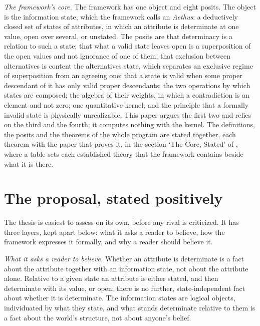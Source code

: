 \emph{The framework's core.} The framework has one object and eight posits. The object is the information state, which the framework calls an \emph{Aethus}: a deductively closed set of states of attributes, in which an attribute is determinate at one value, open over several, or unstated. The posits are that determinacy is a relation to such a state; that what a valid state leaves open is a superposition of the open values and not ignorance of one of them; that exclusion between alternatives is content the alternatives state, which separates an exclusive regime of superposition from an agreeing one; that a state is valid when some proper descendant of it has only valid proper descendants; the two operations by which states are composed; the algebra of their weights, in which a contradiction is an element and not zero; one quantitative kernel; and the principle that a formally invalid state is physically unrealizable. This paper argues the first two and relies on the third and the fourth; it computes nothing with the kernel. The definitions, the posits and the theorems of the whole program are stated together, each theorem with the paper that proves it, in the section `The Core, Stated' of \cite{AethusBrief}, where a table sets each established theory that the framework contains beside what it is there.

\section{The proposal, stated positively}\label{sec:positive}

\noindent The thesis is easiest to assess on its own, before any rival is criticized. It has three layers, kept apart below: what it asks a reader to believe, how the framework expresses it formally, and why a reader should believe it.

\textit{What it asks a reader to believe.} Whether an attribute is determinate is a fact about the attribute together with an information state, not about the attribute alone. Relative to a given state an attribute is either stated, and then determinate with its value, or open; there is no further, state-independent fact about whether it is determinate. The information states are logical objects, individuated by what they state, and what stands determinate relative to them is a fact about the world's structure, not about anyone's belief.

